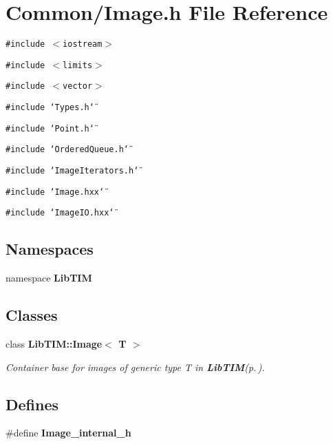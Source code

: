 \section{Common/Image.h File Reference}
\label{Image_8h}
{\tt \#include $<$iostream$>$}\par
{\tt \#include $<$limits$>$}\par
{\tt \#include $<$vector$>$}\par
{\tt \#include \char`\"{}Types.h\char`\"{}}\par
{\tt \#include \char`\"{}Point.h\char`\"{}}\par
{\tt \#include \char`\"{}Ordered\-Queue.h\char`\"{}}\par
{\tt \#include \char`\"{}Image\-Iterators.h\char`\"{}}\par
{\tt \#include \char`\"{}Image.hxx\char`\"{}}\par
{\tt \#include \char`\"{}Image\-IO.hxx\char`\"{}}\par
\subsection*{Namespaces}
\begin{CompactItemize}
\item 
namespace {\bf Lib\-TIM}
\end{CompactItemize}
\subsection*{Classes}
\begin{CompactItemize}
\item 
class {\bf Lib\-TIM::Image$<$ T $>$}
\begin{CompactList}\small\item\em Container base for images of generic type T in {\bf Lib\-TIM}{\rm (p.\,\pageref{namespaceLibTIM})}. \item\end{CompactList}\end{CompactItemize}
\subsection*{Defines}
\begin{CompactItemize}
\item 
\#define {\bf Image\_\-internal\_\-h}
\end{CompactItemize}
